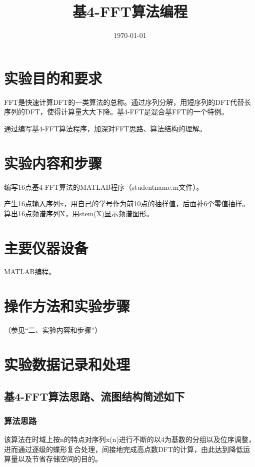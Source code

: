 \documentclass{../source/Experiment}
\title{基4-FFT算法编程}
\date{\today}
\begin{document}
\makeheader
\section{实验目的和要求}

FFT是快速计算DFT的一类算法的总称。通过序列分解，用短序列的DFT代替长序列的DFT，使得计算量大大下降。基4-FFT是混合基FFT的一个特例。

通过编写基4-FFT算法程序，加深对FFT思路、算法结构的理解。


\section{实验内容和步骤}
编写16点基4-FFT算法的MATLAB程序（studentname.m文件）。

产生16点输入序列x，用自己的学号作为前10点的抽样值，后面补6个零值抽样。算出16点频谱序列X，用stem(X)显示频谱图形。

\section{主要仪器设备}

MATLAB编程。

\section{操作方法和实验步骤}

（参见“二、实验内容和步骤”）

\section{实验数据记录和处理}
\subsection{基4-FFT算法思路、流图结构简述如下}
\subsubsection{算法思路}
该算法在时域上按n的特点对序列x(n)进行不断的以4为基数的分组以及位序调整，进而通过逐级的蝶形复合处理，间接地完成高点数DFT的计算，由此达到降低运算量以及节省存储空间的目的。
\end{document}
